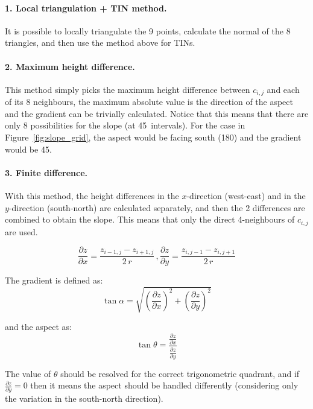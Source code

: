 \paragraph{1. Local triangulation + TIN method.}
It is possible to locally triangulate the 9 points, calculate the normal of the 8 triangles, and then use the method above for TINs.


\paragraph{2. Maximum height difference.}
This method simply picks the maximum height difference between $c_{i,j}$ and each of its 8 neighbours, the maximum absolute value is the direction of the aspect and the gradient can be trivially calculated.
Notice that this means that there are only 8 possibilities for the slope (at 45\degree\ intervals).
For the case in Figure~\ref{fig:slope_grid}, the aspect would be facing south (180\degree) and the gradient would be 45\degree.


\paragraph{3. Finite difference.}

With this method, the height differences in the $x$-direction (west-east) and in the $y$-direction (south-north) are calculated separately, and then the 2 differences are combined to obtain the slope.
This means that only the direct 4-neighbours of $c_{i,j}$ are used.

\begin{equation}
  \frac{\partial z}{\partial x} = \frac{z_{i-1,j} - z_{i+1,j}}{2\,r}
\, , 
  \frac{\partial z}{\partial y} = \frac{z_{i,j-1} - z_{i,j+1}}{2\,r}
\end{equation}

The gradient is defined as:
\begin{equation}
  \tan \alpha = \sqrt{(\frac{\partial z}{\partial x})^2 + (\frac{\partial z}{\partial y})^2}
\end{equation}

and the aspect as:
\begin{equation}
  \tan \theta = \frac{\frac{\partial z}{\partial x}}{\frac{\partial z}{\partial y}}
\end{equation}

The value of $\theta$ should be resolved for the correct trigonometric quadrant, and if $\frac{\partial z}{\partial y} = 0$ then it means the aspect should be handled differently (considering only the variation in the south-north direction). 


